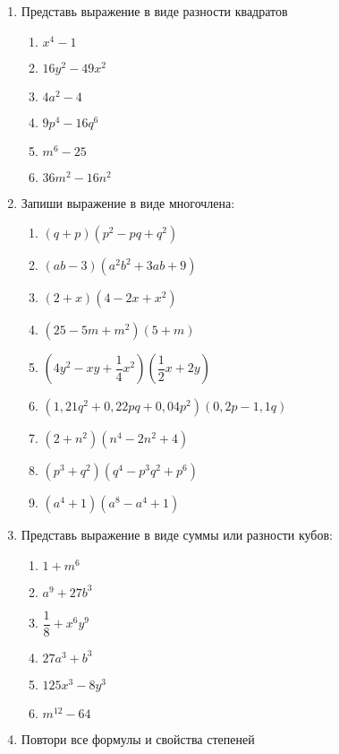 \documentclass[12pt, a4paper]{article}
\begin{document}
	
 \cfoot{}
\begin{enumerate}
	\item Представь выражение в виде разности квадратов
	\begin{multicols}{2}
		\begin{enumerate}[label=\textbf{\arabic*)}]
			\item $x^4-1$
			\item $16y^2-49x^2$
			\item $4a^2-4$
			\item $9p^4-16q^6$
			\item $m^6-25$
			\item $36m^2-16n^2$
		\end{enumerate}
	\end{multicols}
	\item Запиши выражение в виде многочлена:
	\begin{multicols}{2}
		\begin{enumerate}[label=\textbf{\arabic*)}]
			\item $(q+p)(p^2-pq+q^2)$
			\item $(ab-3)(a^2b^2+3ab+9)$
			\item $(2+x)(4-2x+x^2)$
			\item $(25-5m+m^2)(5+m)$
			\item $\left( 4y^2-xy+\dfrac{1}{4}x^2\right)\left(\dfrac{1}{2}x+2y \right)  $
			\item $(1,21q^2+0,22pq+0,04p^2)(0,2p-1,1q)$
			\item $(2+n^2)(n^4-2n^2+4)$
			\item $(p^3+q^2)(q^4-p^3q^2+p^6)$
			\item $(a^4+1)(a^8-a^4+1)$
		\end{enumerate}
	\end{multicols}
	\item Представь выражение в виде суммы или разности кубов:
	\begin{multicols}{2}
		\begin{enumerate}[label=\textbf{\arabic*)}]
			\item $1+m^6$
			\item $a^9+27b^3$
			\item $\dfrac{1}{8}+x^6y^9$
			\item $27a^3+b^3$
			\item $125x^3-8y^3$
			\item $m^{12}-64$
		\end{enumerate}
	\end{multicols}
\item Повтори все формулы и свойства степеней
\end{enumerate}
\end{document}
